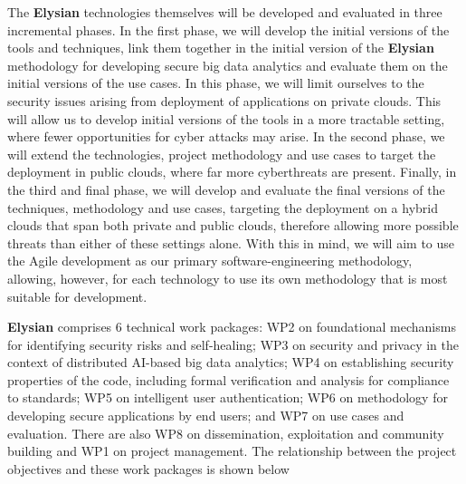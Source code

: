 \documentclass[a4paper,11pt]{article}
\newcommand{\project}[1]{\textbf{#1}\xspace}
\newcommand{\SECURITY}{\project{Elysian}}
\newcommand{\TheProject}{\SECURITY}
\begin{document}
The \TheProject{} technologies themselves will be developed and evaluated in three incremental phases. In the first phase, we will develop the initial versions of the tools and techniques, link them together in the initial version of the \TheProject{} methodology for developing secure big data analytics and evaluate them on the initial versions of the use cases. In this phase, we will limit ourselves to the security issues arising from deployment of applications on private clouds. This will allow us to develop initial versions of the tools in a more tractable setting, where fewer opportunities for cyber attacks may arise. In the second phase, we will extend the technologies, project methodology and use cases to target the deployment in public clouds, where far more cyberthreats are present. Finally, in the third and final phase, we will develop and evaluate the final versions of the techniques, methodology and use cases, targeting the deployment on a hybrid clouds that span both private and public clouds, therefore allowing more possible threats than either of these settings alone. With this in mind, we will aim to use the Agile development as our primary software-engineering methodology, allowing, however, for each technology to use its own methodology that is most suitable for development.

\TheProject{} comprises 6 technical work packages: WP2 on foundational mechanisms for identifying security risks and self-healing; WP3 on security and privacy in the context of distributed AI-based big data analytics; WP4 on establishing security properties of the code, including formal verification and analysis for compliance to standards;  WP5 on intelligent user authentication; WP6 on methodology for developing secure applications by end users; and WP7 on use cases and evaluation. There are also WP8 on dissemination, exploitation and community building and WP1 on project management. The relationship between the project objectives and these work packages is shown below
\end{document}
